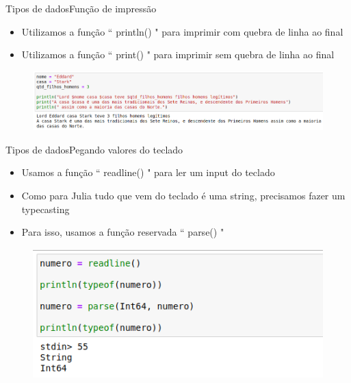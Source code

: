 \documentclass{beamer}
\begin{document}
\begin{frame}{Tipos de dados}{Função de impressão}
    \begin{itemize}
        \item Utilizamos a função `` println() " para imprimir com quebra de linha ao final
        \item Utilizamos a função `` print() " para imprimir sem quebra de linha ao final
    \end{itemize}
    \begin{figure}
        \centering
        \includegraphics[scale=0.35]{imagens/ex-funcao-printar.png}
        \label{fig:ex-tipos}
    \end{figure}
\end{frame}

\begin{frame}{Tipos de dados}{Pegando valores do teclado}
    \begin{itemize}
        \item Usamos a função `` readline() " para ler um input do teclado
        \item Como para Julia tudo que vem do teclado é uma string, precisamos fazer um typecasting
        \item Para isso, usamos a função reservada `` parse() "
    \end{itemize}
    \begin{figure}
        \centering
        \includegraphics[scale=0.35]{imagens/ex-readline.png}
        \label{fig:ex-tipos}
    \end{figure}
\end{frame}
\end{document}
